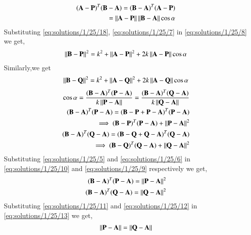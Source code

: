\begin{align}
\begin{split}
 (\mathbf{A}-\mathbf{P})^T(\mathbf{B}-\mathbf{A})=(\mathbf{B}-\mathbf{A})^T(\mathbf{A}-\mathbf{P})\\
 = \left\lVert\mathbf{A}-\mathbf{P}\right\rVert \left\lVert\mathbf{B}-\mathbf{A}\right\rVert \cos\alpha\label{eq:solutions/1/25/18}
\end{split}
\end{align}
Substituting \eqref{eq:solutions/1/25/18}, \eqref{eq:solutions/1/25/7} in \eqref{eq:solutions/1/25/8} we get,
\begin{align}
  \begin{split}
      \left\lVert\mathbf{B}-\mathbf{P}\right\rVert^2=k^2+\left\lVert\mathbf{A}-\mathbf{P}\right\rVert^2
      +2k\left\lVert\mathbf{A}-\mathbf{P}\right\rVert\cos\alpha\label{eq:solutions/1/25/14}
  \end{split}  
\end{align}
Similarly,we get
\begin{align}
    \left\lVert\mathbf{B}-\mathbf{Q}\right\rVert^2=k^2+\left\lVert\mathbf{A}-\mathbf{Q}\right\rVert^2
      +2k\left\lVert\mathbf{A}-\mathbf{Q}\right\rVert\cos\alpha\label{eq:solutions/1/25/15}
\end{align}
\begin{align}
    \cos\alpha = \frac{(\mathbf{B}-\mathbf{A})^T(\mathbf{P}-\mathbf{A})}{k\left\lVert\mathbf{P}-\mathbf{A}\right\rVert} = \frac{(\mathbf{B}-\mathbf{A})^T(\mathbf{Q}-\mathbf{A})}{k\left\lVert\mathbf{Q}-\mathbf{A}\right\rVert}\label{eq:solutions/1/25/13}\\
    (\mathbf{B}-\mathbf{A})^T(\mathbf{P}-\mathbf{A})=(\mathbf{B}-\mathbf{P}+\mathbf{P}-\mathbf{A})^T(\mathbf{P}-\mathbf{A})\\
    \implies (\mathbf{B}-\mathbf{P})^T(\mathbf{P}-\mathbf{A}) + \left\lVert\mathbf{P}-\mathbf{A}\right\rVert^2\label{eq:solutions/1/25/9}\\
    (\mathbf{B}-\mathbf{A})^T(\mathbf{Q}-\mathbf{A})=(\mathbf{B}-\mathbf{Q}+\mathbf{Q}-\mathbf{A})^T(\mathbf{Q}-\mathbf{A})\\
     \implies (\mathbf{B}-\mathbf{Q})^T(\mathbf{Q}-\mathbf{A}) + \left\lVert\mathbf{Q}-\mathbf{A}\right\rVert^2\label{eq:solutions/1/25/10}
\end{align}
Substituting \eqref{eq:solutions/1/25/5} and \eqref{eq:solutions/1/25/6} in \eqref{eq:solutions/1/25/10} and \eqref{eq:solutions/1/25/9} respectively we get,
\begin{align}
    (\mathbf{B}-\mathbf{A})^T(\mathbf{P}-\mathbf{A})=\left\lVert\mathbf{P}-\mathbf{A}\right\rVert^2\label{eq:solutions/1/25/11}\\
    (\mathbf{B}-\mathbf{A})^T(\mathbf{Q}-\mathbf{A})=\left\lVert\mathbf{Q}-\mathbf{A}\right\rVert^2\label{eq:solutions/1/25/12}
\end{align}
Substituting \eqref{eq:solutions/1/25/11} and \eqref{eq:solutions/1/25/12} in \eqref{eq:solutions/1/25/13} we get,
\begin{align}
    \left\lVert\mathbf{P}-\mathbf{A}\right\rVert=\left\lVert\mathbf{Q}-\mathbf{A}\right\rVert\label{eq:solutions/1/25/16}
\end{align}
